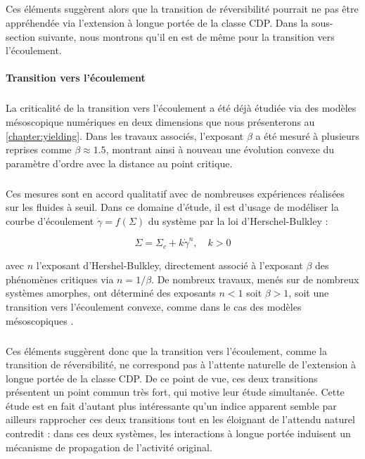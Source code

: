 \subparagraph{}Ces éléments suggèrent alors que la transition de réversibilité pourrait ne pas être appréhendée via l'extension à longue portée de la classe CDP. Dans la sous-section suivante, nous montrons qu'il en est de même pour la transition vers l'écoulement.

\paragraph{Transition vers l'écoulement}

\subparagraph{}La criticalité de la transition vers l'écoulement a été déjà étudiée via des modèles mésoscopique numériques en deux dimensions que nous présenterons au \autoref{chapter:yielding}\cite{lin_scaling_2014, liu_driving_2016, ferrero_criticality_2019, picard_slow_2005}. Dans les travaux associés, l'exposant $\beta$ a été mesuré à plusieurs reprises comme $\beta\approx 1.5$, montrant ainsi à nouveau une évolution convexe du paramètre d'ordre avec la distance au point critique.

\subparagraph{}Ces mesures sont en accord qualitatif avec de nombreuses expériences réalisées sur les fluides à seuil. Dans ce domaine d'étude, il est d'usage de modéliser la courbe d'écoulement $\dot{\gamma} = f(\Sigma)$ du système par la loi d'Herschel-Bulkley :

\begin{equation}
	\Sigma = \Sigma_c + k\dot{\gamma}^n, \quad k > 0
\end{equation}

\noindent avec $n$ l'exposant d'Hershel-Bulkley, directement associé à l'exposant $\beta$ des phénomènes critiques via $n=1/\beta$. De nombreux travaux, menés sur de nombreux systèmes amorphes, ont déterminé des exposants $n<1$ soit $\beta > 1$, soit une transition vers l'écoulement convexe, comme dans le cas des modèles mésoscopiques \cite{nicolas_deformation_2018}.

\subparagraph{}Ces éléments suggèrent donc que la transition vers l'écoulement, comme la transition de réversibilité, ne correspond pas à l'attente naturelle de l'extension à longue portée de la classe CDP. De ce point de vue, ces deux transitions présentent un point commun très fort, qui motive leur étude simultanée. Cette étude est en fait d'autant plus intéressante qu'un indice apparent semble par ailleurs rapprocher ces deux transitions tout en les éloignant de l'attendu naturel contredit : dans ces deux systèmes, les interactions à longue portée induisent un mécanisme de propagation de l'activité original.

